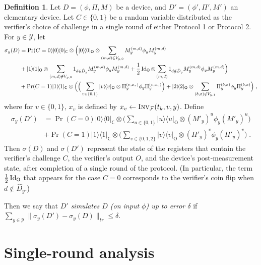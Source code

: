\documentclass[11pt]{article}
\theoremstyle{remark}
\theoremstyle{definition}
\newtheorem{definition}[theorem]{Definition}
\newcommand{\ket}[1]{|#1\rangle}
\newcommand{\bra}[1]{\langle#1|}
\newcommand{\proj}[1]{\ket{#1}\!\bra{#1}}
\newcommand{\Id}{\ensuremath{\mathop{\rm Id}\nolimits}}
\newcommand{\reg}[1]{{\textsf{#1}}}
\newcommand{\mF}{\ensuremath{\mathcal{F}}}
\newcommand{\mY}{\ensuremath{\mathcal{Y}}}
\newcommand{\Inv}{\ensuremath{\textsc{Inv}}}
\begin{document}
\begin{definition}\label{def:device-dist}
Let $D = (\phi,\Pi,M)$ be a device, and $D'=(\phi',\Pi',M')$ an elementary device. 
Let $C\in\{0,1\}$ be a random variable distributed as the verifier's choice of challenge in a single round of either Protocol 1 or Protocol 2. For $y\in \mY$, let
\begin{align*}
\sigma_y(D) &=   \Pr(C=0) \proj{0}_\reg{C} \otimes\Big(  \proj{0}_\reg{O} \otimes  \sum_{(m,d) \in V_{y,0}}  M_y^{(m,d)} \phi_y M_y^{(m,d)}\\
& +   \proj{1}_\reg{O} \otimes  \sum_{(m,d) \notin V_{y,0}} 1_{d\in \hat{D}_y}  M_y^{(m,d)} \phi_y M_y^{(m,d)} + \frac{1}{2}\Id_{\reg{O}}\otimes  \sum_{(m,d)} 1_{d\notin \hat{D}_y}  M_y^{(m,d)} \phi_y M_y^{(m,d)} \Big)\\
&+\Pr(C=1)\proj{1}_\reg{C} \otimes \Big( \Big(\sum_{v\in\{0,1\}} \proj{v}_\reg{O} \otimes  \Pi_y^{(v,x_v)} \phi_y \Pi_y^{(v,x_v)} \Big)+ \proj{2}_\reg{O}\otimes \sum_{(b,x)\notin V_{y,1}}  \Pi_y^{(b,x)} \phi_y \Pi_y^{(b,x)}\Big)\;,
\end{align*}
where for $v\in\{0,1\}$, $x_v$ is defined by $x_v\leftarrow \Inv_\mF(t_k,v,y)$. Define 
\begin{align*}
\sigma_y(D') &= \Pr(C=0) \proj{0}_\reg{C} \otimes\big( \sum_{u\in \{0,1\}} \proj{u}_\reg{O}\otimes (M'_y)^{u} \phi_y (M'_y)^{u}\Big)\\
&+\Pr(C=1)\proj{1}_\reg{C} \otimes \Big(\sum_{v\in\{0,1,2\}} \proj{v}_\reg{O} \otimes  (\Pi'_y)^{v} \phi_y (\Pi'_y)^{v} \Big)\;.
\end{align*}
Then $\sigma(D)$ and $\sigma(D')$ represent the state of the registers that contain the verifier's challenge $C$, the verifier's output $O$, and the device's post-measurement state, after completion of a single round of the protocol. (In particular, the term $\frac{1}{2}\Id_{\reg{O}}$ that appears for the case $C=0$ corresponds to the verifier's coin flip when $d\notin \hat{D}_y$.)

Then we say that \emph{$D'$ simulates $D$ (on input $\phi$) up to error $\delta$} if $\sum_{y\in\mY}\|\sigma_y(D')-\sigma_y(D)\|_{tr} \leq \delta$. 
\end{definition}




\section{Single-round analysis}
\label{sec:soundness}
\end{document}
